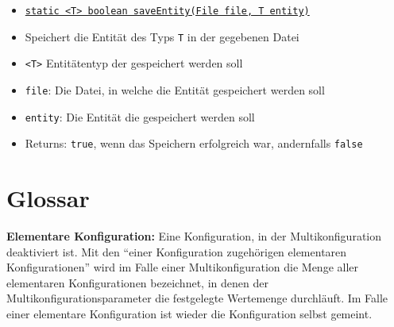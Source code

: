 \documentclass[parskip=full,11pt]{scrartcl}
\begin{document}
\begin{itemize}
	\item \underline{\texttt{static <T> boolean saveEntity(File file, T entity)}}
	\item[] Speichert die Entität des Typs \texttt{T} in der gegebenen Datei
	\item[] \texttt{<T>} Entitätentyp der gespeichert werden soll
	\item[] \texttt{file}: Die Datei, in welche die Entität gespeichert werden soll
	\item[] \texttt{entity}: Die Entität die gespeichert werden soll
	\item[]Returns: \texttt{true}, wenn das Speichern erfolgreich war, andernfalls \texttt{false}
\end{itemize}

\section{Glossar}
\textbf{Elementare Konfiguration:}
Eine Konfiguration, in der Multikonfiguration deaktiviert ist. Mit den \enquote{einer Konfiguration zugehörigen elementaren Konfigurationen} wird im Falle einer Multikonfiguration die Menge aller elementaren Konfigurationen bezeichnet, in denen der Multikonfigurationsparameter die festgelegte Wertemenge durchläuft. Im Falle einer elementare Konfiguration ist wieder die Konfiguration selbst gemeint.
\end{document}
